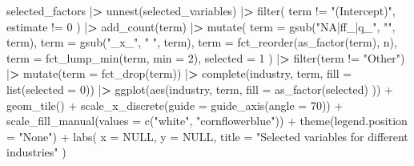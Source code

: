 \documentclass[
]{krantz}
\newenvironment{Shaded}{\begin{snugshade}}{\end{snugshade}}
\newcommand{\AttributeTok}[1]{\textcolor[rgb]{0.61,0.61,0.61}{#1}}
\newcommand{\ConstantTok}[1]{\textcolor[rgb]{0,0,0}{#1}}
\newcommand{\DecValTok}[1]{\textcolor[rgb]{0.06,0.06,0.06}{#1}}
\newcommand{\ErrorTok}[1]{\textcolor[rgb]{0.14,0.14,0.14}{\textbf{#1}}}
\newcommand{\FunctionTok}[1]{\textcolor[rgb]{0,0,0}{#1}}
\newcommand{\NormalTok}[1]{#1}
\newcommand{\SpecialCharTok}[1]{\textcolor[rgb]{0,0,0}{#1}}
\newcommand{\StringTok}[1]{\textcolor[rgb]{0.5,0.5,0.5}{#1}}
\begin{document}
\begin{Shaded}
\begin{Highlighting}[]
\NormalTok{selected\_factors }\SpecialCharTok{|}\ErrorTok{\textgreater{}}
  \FunctionTok{unnest}\NormalTok{(selected\_variables) }\SpecialCharTok{|}\ErrorTok{\textgreater{}}
  \FunctionTok{filter}\NormalTok{(}
\NormalTok{    term }\SpecialCharTok{!=} \StringTok{"(Intercept)"}\NormalTok{,}
\NormalTok{    estimate }\SpecialCharTok{!=} \DecValTok{0}
\NormalTok{  ) }\SpecialCharTok{|}\ErrorTok{\textgreater{}}
  \FunctionTok{add\_count}\NormalTok{(term) }\SpecialCharTok{|}\ErrorTok{\textgreater{}}
  \FunctionTok{mutate}\NormalTok{(}
    \AttributeTok{term =} \FunctionTok{gsub}\NormalTok{(}\StringTok{"NA|ff\_|q\_"}\NormalTok{, }\StringTok{""}\NormalTok{, term),}
    \AttributeTok{term =} \FunctionTok{gsub}\NormalTok{(}\StringTok{"\_x\_"}\NormalTok{, }\StringTok{" "}\NormalTok{, term),}
    \AttributeTok{term =} \FunctionTok{fct\_reorder}\NormalTok{(}\FunctionTok{as\_factor}\NormalTok{(term), n),}
    \AttributeTok{term =} \FunctionTok{fct\_lump\_min}\NormalTok{(term, }\AttributeTok{min =} \DecValTok{2}\NormalTok{),}
    \AttributeTok{selected =} \DecValTok{1}
\NormalTok{  ) }\SpecialCharTok{|}\ErrorTok{\textgreater{}}
  \FunctionTok{filter}\NormalTok{(term }\SpecialCharTok{!=} \StringTok{"Other"}\NormalTok{) }\SpecialCharTok{|}\ErrorTok{\textgreater{}}
  \FunctionTok{mutate}\NormalTok{(}\AttributeTok{term =} \FunctionTok{fct\_drop}\NormalTok{(term)) }\SpecialCharTok{|}\ErrorTok{\textgreater{}}
  \FunctionTok{complete}\NormalTok{(industry, term, }\AttributeTok{fill =} \FunctionTok{list}\NormalTok{(}\AttributeTok{selected =} \DecValTok{0}\NormalTok{)) }\SpecialCharTok{|}\ErrorTok{\textgreater{}}
  \FunctionTok{ggplot}\NormalTok{(}\FunctionTok{aes}\NormalTok{(industry,}
\NormalTok{    term,}
    \AttributeTok{fill =} \FunctionTok{as\_factor}\NormalTok{(selected)}
\NormalTok{  )) }\SpecialCharTok{+}
  \FunctionTok{geom\_tile}\NormalTok{() }\SpecialCharTok{+}
  \FunctionTok{scale\_x\_discrete}\NormalTok{(}\AttributeTok{guide =} \FunctionTok{guide\_axis}\NormalTok{(}\AttributeTok{angle =} \DecValTok{70}\NormalTok{)) }\SpecialCharTok{+}
  \FunctionTok{scale\_fill\_manual}\NormalTok{(}\AttributeTok{values =} \FunctionTok{c}\NormalTok{(}\StringTok{"white"}\NormalTok{, }\StringTok{"cornflowerblue"}\NormalTok{)) }\SpecialCharTok{+}
  \FunctionTok{theme}\NormalTok{(}\AttributeTok{legend.position =} \StringTok{"None"}\NormalTok{) }\SpecialCharTok{+}
  \FunctionTok{labs}\NormalTok{(}
    \AttributeTok{x =} \ConstantTok{NULL}\NormalTok{, }\AttributeTok{y =} \ConstantTok{NULL}\NormalTok{,}
    \AttributeTok{title =} \StringTok{"Selected variables for different industries"}
\NormalTok{  )}
\end{Highlighting}
\end{Shaded}
\end{document}
